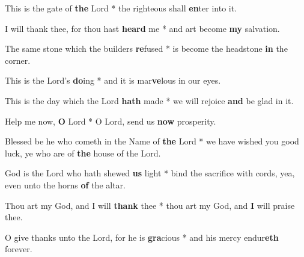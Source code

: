 \begin{multicols}{2}
	This is the gate of \textbf{the} Lord * the righteous shall \textbf{en}ter into it.
	
	I will thank thee, for thou hast \textbf{heard} me * and art become \textbf{my} salvation.
	
	The same stone which the builders \textbf{re}fused * is become the headstone \textbf{in} the corner.
	
	This is the Lord's \textbf{do}ing * and it is mar\textbf{ve}lous in our eyes.
	
	This is the day which the Lord \textbf{hath} made * we will rejoice \textbf{and} be glad in it.
	
	Help me now, \textbf{O} Lord * O Lord, send us \textbf{now} prosperity.
	
	Blessed be he who cometh in the Name of \textbf{the} Lord * we have wished you good luck, ye who are of \textbf{the} house of the Lord.
	
	God is the Lord who hath shewed \textbf{us} light * bind the sacrifice with cords, yea, even unto the horns \textbf{of} the altar.
	
	Thou art my God, and I will \textbf{thank} thee * thou art my God, and \textbf{I} will praise thee.
	
	O give thanks unto the Lord, for he is \textbf{gra}cious * and his mercy endur\textbf{eth} forever.
\end{multicols}